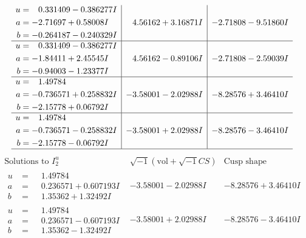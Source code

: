 \documentclass[1p]{elsarticle_modified}
\theoremstyle{definition}
\newcommand{\I}{\sqrt{-1}}
\begin{document}
$$\begin{array}{c|c|c}
\begin{aligned}
u &= \phantom{-}0.331409 - 0.386277 I \\
a &= -2.71697 + 0.58008 I \\
b &= -0.264187 - 0.240329 I\end{aligned}
 & \phantom{-}4.56162 + 3.16871 I & -2.71808 - 9.51860 I \\ \hline\begin{aligned}
u &= \phantom{-}0.331409 - 0.386277 I \\
a &= -1.84411 + 2.45545 I \\
b &= -0.94003 - 1.23377 I\end{aligned}
 & \phantom{-}4.56162 - 0.89106 I & -2.71808 - 2.59039 I \\ \hline\begin{aligned}
u &= \phantom{-}1.49784\phantom{ +0.000000I} \\
a &= -0.736571 + 0.258832 I \\
b &= -2.15778 + 0.06792 I\end{aligned}
 & -3.58001 - 2.02988 I & -8.28576 + 3.46410 I \\ \hline\begin{aligned}
u &= \phantom{-}1.49784\phantom{ +0.000000I} \\
a &= -0.736571 - 0.258832 I \\
b &= -2.15778 - 0.06792 I\end{aligned}
 & -3.58001 + 2.02988 I & -8.28576 - 3.46410 I\\
 \hline 
 \end{array}$$\newpage$$\begin{array}{c|c|c}  
\text{Solutions to }I^u_{2}& \I (\text{vol} + \sqrt{-1}CS) & \text{Cusp shape}\\
 \hline 
\begin{aligned}
u &= \phantom{-}1.49784\phantom{ +0.000000I} \\
a &= \phantom{-}0.236571 + 0.607193 I \\
b &= \phantom{-}1.35362 + 1.32492 I\end{aligned}
 & -3.58001 - 2.02988 I & -8.28576 + 3.46410 I \\ \hline\begin{aligned}
u &= \phantom{-}1.49784\phantom{ +0.000000I} \\
a &= \phantom{-}0.236571 - 0.607193 I \\
b &= \phantom{-}1.35362 - 1.32492 I\end{aligned}
 & -3.58001 + 2.02988 I & -8.28576 - 3.46410 I \\ \hline\begin{aligned}

\end{aligned}
\end{array}$$
\end{document}
